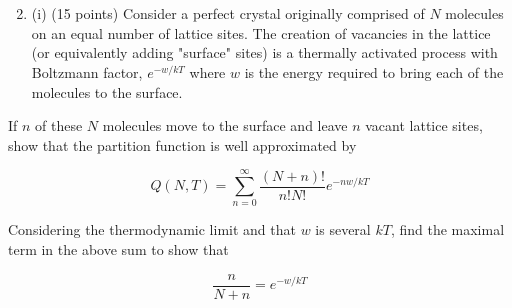 \documentclass[12pt]{article}
\begin{document}
\section{}
\begin{enumerate}
  \setcounter{enumi}{1}
  \item (i) (15 points) Consider a perfect crystal originally comprised of $N$ molecules on an equal number of lattice sites. The creation of vacancies in the lattice (or equivalently adding "surface" sites) is a thermally activated process with Boltzmann factor, $e^{-w / k T}$ where $w$ is the energy required to bring each of the molecules to the surface.
\end{enumerate}

If $n$ of these $N$ molecules move to the surface and leave $n$ vacant lattice sites, show that the partition function is well approximated by

$$
Q(N, T)=\sum_{n=0}^{\infty} \frac{(N+n) !}{n ! N !} e^{-n w / k T}
$$

Considering the thermodynamic limit and that $w$ is several $k T$, find the maximal term in the above sum to show that

$$
\frac{n}{N+n}=e^{-w / k T}
$$
\end{document}
